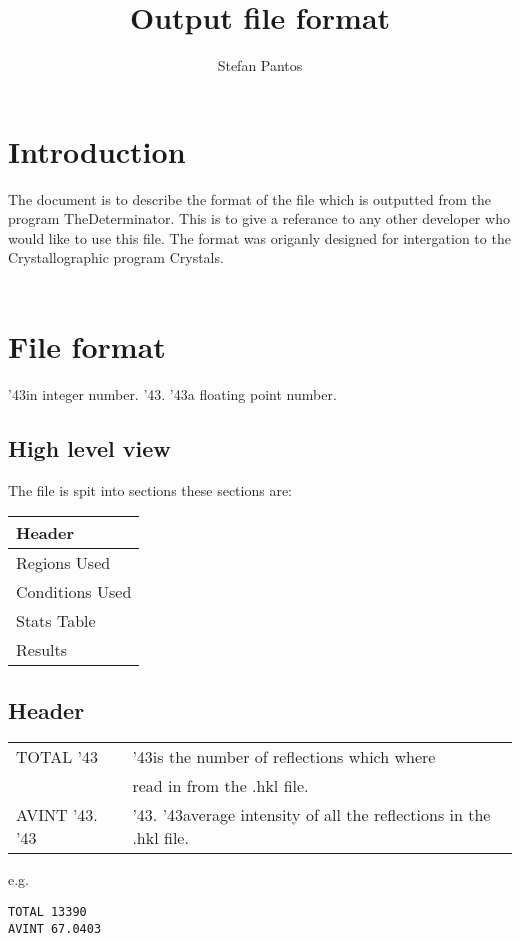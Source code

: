 \documentclass[11pt]{article}
\title{Output file format}
\author{Stefan Pantos}
\newcommand{\hash}{\char '43} %
\begin{document}
\maketitle
\section{Introduction}
The document is to describe the format of the file which is outputted from the program TheDeterminator. This is to give a referance to any other developer who would like to use this file. The format was origanly designed for intergation to the Crystallographic program Crystals.\\\\
\section{File format}
\small{\hash in integer number. \hash . \hash a floating point number.}
\subsection{High level view}
The file is spit into sections these sections are:\\
\begin{table}[h]
\begin{tabular}{|l|}\hline
Header\\
\hline
Regions Used\\
\hline
Conditions Used\\
\hline
Stats Table\\
\hline
Results\\
\hline
\end{tabular}
\end{table}
\subsection{Header}
\begin{table}[h]
\begin{tabular}{|l|l|}\hline
TOTAL \hash & \hash  is the number of reflections which where\\
		&	read in from the .hkl file.\\
\hline
AVINT \hash . \hash & \hash . \hash average intensity of all the reflections in the .hkl file.\\
\hline
\end{tabular}
\end{table}
e.g.
\begin{verbatim}
TOTAL 13390
AVINT 67.0403
\end{verbatim}
\end{document}
